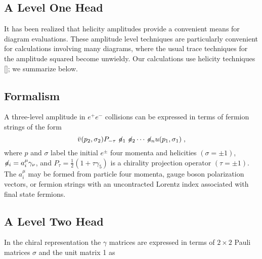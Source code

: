 \begin{article}

\section{A Level One Head}\label{text}
   It has been realized that helicity amplitudes provide
a convenient means for diagram evaluations.  These
amplitude level techniques are particularly convenient
for calculations involving many diagrams, where the
usual trace techniques for the amplitude squared become
unwieldy.  Our calculations use helicity techniques
[]; 
we summarize below.

\subsection{Formalism}
A three-level amplitude in $ e^+e^-$ collisions can be
expressed in terms of fermion strings of the form
\begin{equation}
   \bar v(p_2,\sigma_2)P_{-\tau}\not\!a_1\not\!a_2
   \cdots\not\!a_nu(p_1,\sigma_1)\;,
\end{equation}
where $p$ and $\sigma$ label the initial $e^{\pm}$
four momenta and helicities $(\sigma = \pm 1)$,
$\not\!a_i=a^\mu_i\gamma_\nu$, and 
$P_\tau=\frac{1}{2}(1+\tau\gamma_5)$ is a chirality 
projection operator $(\tau = \pm1)$.  The $a^\mu_i$ 
may be formed from particle four momenta, gauge boson
polarization vectors, or fermion strings with an 
uncontracted Lorentz index associated with final state 
fermions.

\subsection{A Level Two Head}
In the chiral representation the $\gamma$ matrices 
are expressed in terms of $2\times 2$ Pauli matrices 
$\sigma$ and the unit matrix 1 as


\end{article}
